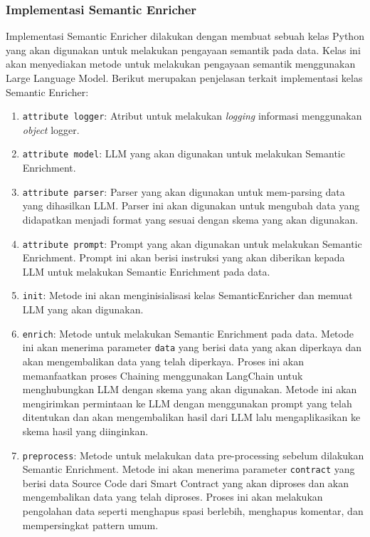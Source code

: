 \subsubsection{Implementasi Semantic Enricher}

Implementasi Semantic Enricher dilakukan dengan membuat sebuah kelas Python yang akan digunakan untuk melakukan pengayaan semantik pada data. Kelas ini akan menyediakan metode untuk melakukan pengayaan semantik menggunakan Large Language Model. Berikut merupakan penjelasan terkait implementasi kelas Semantic Enricher:

\begin{enumerate}
    \item \texttt{attribute logger}: Atribut untuk melakukan \textit{logging} informasi menggunakan \textit{object} logger.
    \item \texttt{attribute model}: LLM yang akan digunakan untuk melakukan Semantic Enrichment.
    \item \texttt{attribute parser}: Parser yang akan digunakan untuk mem-parsing data yang dihasilkan LLM. Parser ini akan digunakan untuk mengubah data yang didapatkan menjadi format yang sesuai dengan skema yang akan digunakan.
    \item \texttt{attribute prompt}: Prompt yang akan digunakan untuk melakukan Semantic Enrichment. Prompt ini akan berisi instruksi yang akan diberikan kepada LLM untuk melakukan Semantic Enrichment pada data.
    \item \texttt{\textunderscore\textunderscore init\textunderscore\textunderscore}: Metode ini akan menginisialisasi kelas SemanticEnricher dan memuat LLM yang akan digunakan.
    \item \texttt{enrich}: Metode untuk melakukan Semantic Enrichment pada data. Metode ini akan menerima parameter \texttt{data} yang berisi data yang akan diperkaya dan akan mengembalikan data yang telah diperkaya. Proses ini akan memanfaatkan proses Chaining menggunakan LangChain untuk menghubungkan LLM dengan skema yang akan digunakan. Metode ini akan mengirimkan permintaan ke LLM dengan menggunakan prompt yang telah ditentukan dan akan mengembalikan hasil dari LLM lalu mengaplikasikan ke skema hasil yang diinginkan.
    \item \texttt{preprocess}: Metode untuk melakukan data pre-processing sebelum dilakukan Semantic Enrichment. Metode ini akan menerima parameter \texttt{contract} yang berisi data Source Code dari Smart Contract yang akan diproses dan akan mengembalikan data yang telah diproses. Proses ini akan melakukan pengolahan data seperti menghapus spasi berlebih, menghapus komentar, dan mempersingkat pattern umum. 
\end{enumerate}


